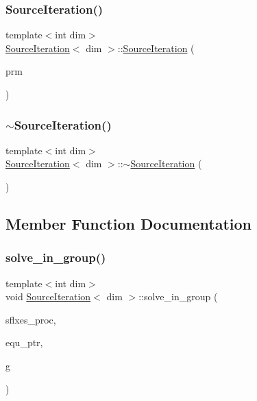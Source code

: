 \subsubsection{\texorpdfstring{Source\+Iteration()}{SourceIteration()}}
{\footnotesize\ttfamily template$<$int dim$>$ \\
\hyperlink{class_source_iteration}{Source\+Iteration}$<$ dim $>$\+::\hyperlink{class_source_iteration}{Source\+Iteration} (\begin{DoxyParamCaption}\item[{const Parameter\+Handler \&}]{prm }\end{DoxyParamCaption})}

\mbox{\label{class_source_iteration_ae18057a8b8501d9e89b08ecfb33ef499}} 
\subsubsection{\texorpdfstring{$\sim$\+Source\+Iteration()}{~SourceIteration()}}
{\footnotesize\ttfamily template$<$int dim$>$ \\
\hyperlink{class_source_iteration}{Source\+Iteration}$<$ dim $>$\+::$\sim$\hyperlink{class_source_iteration}{Source\+Iteration} (\begin{DoxyParamCaption}{ }\end{DoxyParamCaption})}



\subsection{Member Function Documentation}
\mbox{\label{class_source_iteration_a6d726b9a581391cc4164c29f4ccd1ca5}} 
\subsubsection{\texorpdfstring{solve\+\_\+in\+\_\+group()}{solve\_in\_group()}}
{\footnotesize\ttfamily template$<$int dim$>$ \\
void \hyperlink{class_source_iteration}{Source\+Iteration}$<$ dim $>$\+::solve\+\_\+in\+\_\+group (\begin{DoxyParamCaption}\item[{std\+::vector$<$ Vector$<$ double $>$ $>$ \&}]{sflxes\+\_\+proc,  }\item[{std\+\_\+cxx11\+::shared\+\_\+ptr$<$ \hyperlink{class_equation_base}{Equation\+Base}$<$ dim $>$ $>$}]{equ\+\_\+ptr,  }\item[{unsigned int \&}]{g }\end{DoxyParamCaption})\hspace{0.3cm}{\ttfamily [virtual]}}



